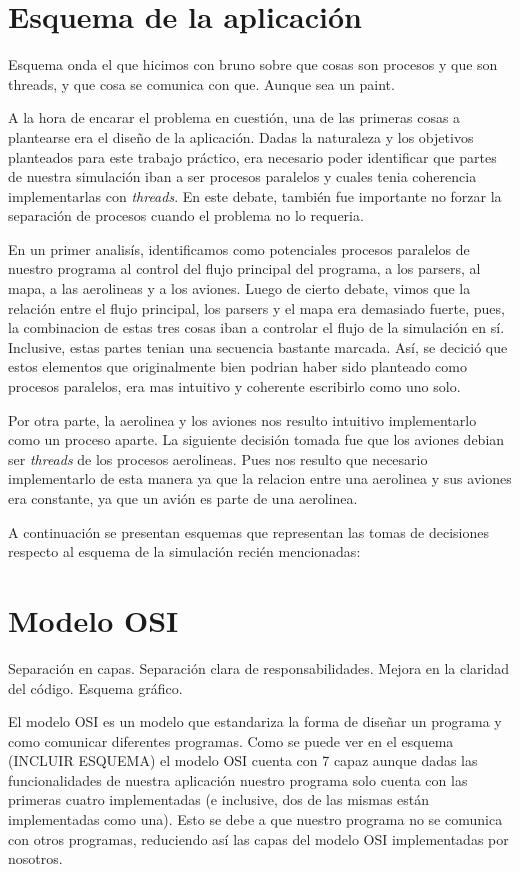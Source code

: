 \documentclass[a4paper,10pt]{article}
\begin{document}
\newpage
\section{Esquema de la aplicación}
Esquema onda el que hicimos con bruno sobre que cosas son procesos y que son threads, y que cosa se comunica con que. Aunque sea un paint.

A la hora de encarar el problema en cuestión, una de las primeras cosas a plantearse era el diseño de la aplicación. Dadas la naturaleza y los objetivos planteados para este trabajo práctico, era necesario poder identificar que partes de nuestra simulación iban a ser procesos paralelos y cuales tenia coherencia implementarlas con \textit{threads}. En este debate, también fue importante no forzar la separación de procesos cuando el problema no lo requeria. 

En un primer analisís, identificamos como potenciales procesos paralelos de nuestro programa al control del flujo principal del programa, a los parsers, al mapa, a las aerolineas y a los aviones. Luego de cierto debate, vimos que la relación entre el flujo principal, los parsers y el mapa era demasiado fuerte, pues, la combinacion de estas tres cosas iban a controlar el flujo de la simulación en sí. Inclusive, estas partes tenian una secuencia bastante marcada. Así, se decició que estos elementos que originalmente bien podrian haber sido planteado como procesos paralelos, era mas intuitivo y coherente escribirlo como uno solo. 

Por otra parte, la aerolinea y los aviones nos resulto intuitivo implementarlo como un proceso aparte. La siguiente decisión tomada fue que los aviones debian ser \textit{threads} de los procesos aerolineas. Pues nos resulto que necesario implementarlo de esta manera ya que la relacion entre una aerolinea y sus aviones era constante, ya que un avión es parte de una aerolinea.

A continuación se presentan esquemas que representan las tomas de decisiones respecto al esquema de la simulación recién mencionadas:

\newpage
\section{Modelo OSI}
Separación en capas. Separación clara de responsabilidades. Mejora en la claridad del código.
Esquema gráfico.

El modelo OSI es un modelo que estandariza la forma de diseñar un programa y como comunicar diferentes programas. Como se puede ver en el esquema (INCLUIR ESQUEMA) el modelo OSI cuenta con 7 capaz aunque dadas las funcionalidades de nuestra aplicación nuestro programa solo cuenta con las primeras cuatro implementadas (e inclusive, dos de las mismas están implementadas como una). Esto se debe a que nuestro programa no se comunica con otros programas, reduciendo así las capas del modelo OSI implementadas por nosotros.
\end{document}
